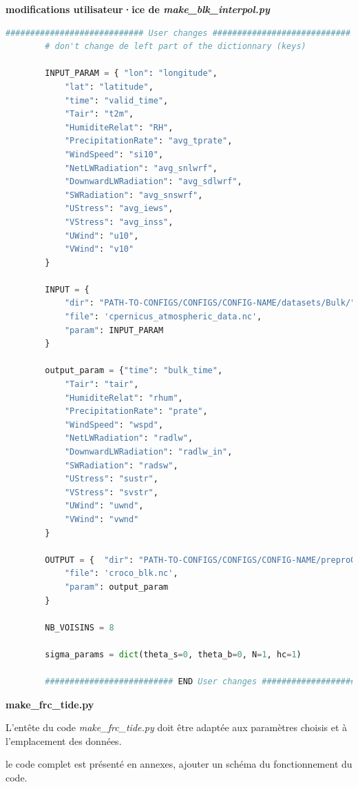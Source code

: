 \documentclass[10pt,a4paper,titlepage]{article}
\begin{document}
\begin{codeEnv}{\textbf{modifications utilisateur·ice de \textit{make\_blk\_interpol.py}}}
    \begin{lstlisting}[language=python]
        ############################ User changes ############################
        # don't change de left part of the dictionnary (keys)

        INPUT_PARAM = {	"lon": "longitude",
            "lat": "latitude",
            "time": "valid_time",
            "Tair": "t2m",
            "HumiditeRelat": "RH",
            "PrecipitationRate": "avg_tprate",
            "WindSpeed": "si10",
            "NetLWRadiation": "avg_snlwrf",
            "DownwardLWRadiation": "avg_sdlwrf",
            "SWRadiation": "avg_snswrf",
            "UStress": "avg_iews",
            "VStress": "avg_inss",
            "UWind": "u10",
            "VWind": "v10"
        }

        INPUT = {
            "dir": "PATH-TO-CONFIGS/CONFIGS/CONFIG-NAME/datasets/Bulk/",
            "file": 'cpernicus_atmospheric_data.nc',
            "param": INPUT_PARAM
        }

        output_param = {"time": "bulk_time",
            "Tair": "tair",
            "HumiditeRelat": "rhum",
            "PrecipitationRate": "prate",
            "WindSpeed": "wspd",
            "NetLWRadiation": "radlw",
            "DownwardLWRadiation": "radlw_in",
            "SWRadiation": "radsw",
            "UStress": "sustr",
            "VStress": "svstr",
            "UWind": "uwnd",
            "VWind": "vwnd"
        }

        OUTPUT = {	"dir": "PATH-TO-CONFIGS/CONFIGS/CONFIG-NAME/preproOUTPUT/",
            "file": 'croco_blk.nc',
            "param": output_param
        }

        NB_VOISINS = 8

        sigma_params = dict(theta_s=0, theta_b=0, N=1, hc=1)

        ########################## END User changes ##########################
    \end{lstlisting}
\end{codeEnv}

\textbf{make\_frc\_tide.py}

L'entête du code \textit{make\_frc\_tide.py} doit être adaptée aux paramètres choisis et à l'emplacement des données.

le code complet est présenté en annexes, ajouter un schéma du fonctionnement du code.
\end{document}
